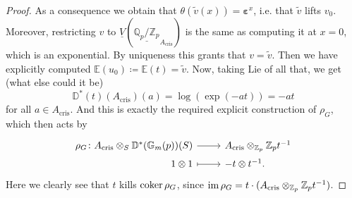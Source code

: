 \begin{proof}
	As a consequence we obtain that $\theta(\widetilde{v}(x)) = \boldsymbol\varepsilon^x$,
	i.e. that $\widetilde{v}$ lifts $v_0$.
	Moreover, restricting $v$ to $\underline{V}
	(\underline{\mathbb{Q}_p/\mathbb{Z}_{p}}_{A_{\mathrm{cris}}})$ 
	is the same as computing it at $x=0$, which is an exponential.
	By uniqueness this grants that $v = \widetilde{v}$.
	Then we have explicitly computed $\mathbb{E}(u_0) \coloneqq \mathbb{E}(t) = \widetilde{v}$.
	Now, taking $\mathrm{Lie}$ of all that, we get (what else could it be)
	\begin{equation*}
		\mathbb{D}^*(t)(A_{\mathrm{cris}})(a) = \log \left( \exp (-at) \right) = -at
	\end{equation*}
	for all $a \in A_{\mathrm{cris}}$.
	And this is exactly the required explicit construction of $\rho_G$, which
	then acts by
	\begin{equation*}
	\begin{tikzcd}[row sep = 0ex
		,/tikz/column 1/.append style={anchor=base east}
		,/tikz/column 2/.append style={anchor=base west}]
		\rho_G\colon 
		A_{\mathrm{cris}} \otimes_S \mathbb{D}^*(\mathbb{G}_m(p))(S)
		\arrow[r, "", rightarrow] &
		A_{\mathrm{cris}} \otimes_{\mathbb{Z}_{p}} \mathbb{Z}_{p} t^{-1} \\
		1 \otimes 1 \arrow[r, "", mapsto] & -t \otimes t^{-1}
	.\end{tikzcd}
	\end{equation*} 
	Here we clearly see that $t$ kills $\operatorname{coker} \rho_G$, since
	$\operatorname{im} \rho_G = t \cdot (A_{\mathrm{cris}} \otimes_{\mathbb{Z}_{p}} \mathbb{Z}_{p} t^{-1})$.


\end{proof}
